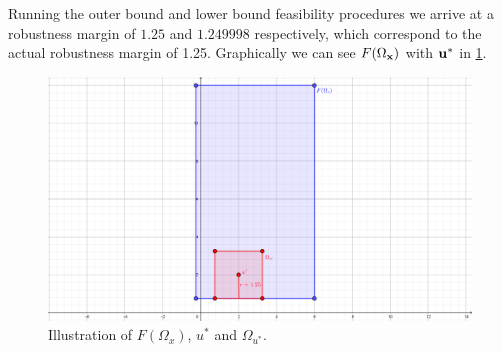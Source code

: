 Running the outer bound and lower bound feasibility procedures we arrive at a robustness margin of $1.25$ and $1.249998$ respectively, which correspond to the actual robustness margin of 1.25. 
Graphically we can see $F(\Omega_{\mathbf{x}})$ with $\mathbf{u}^*$ in \cref{fig:FOmega}.

\begin{figure}[htp!]
	\begin{center}
		\includegraphics[scale=0.45]{Figures/FOmega2} %
	\end{center}
	\caption{Illustration of $F(\Omega_x)$, $u^*$ and $\Omega_{u^*}$.}
	\label{fig:FOmega}
\end{figure}

